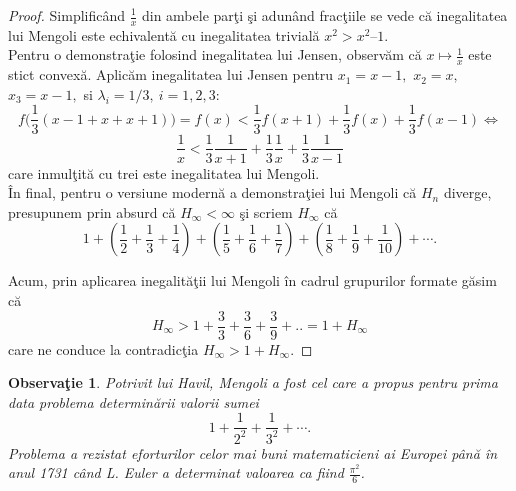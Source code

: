 \documentclass[a4paper,12pt,oneside]{report}
\newtheorem{remark}{Observa\c{t}ie}
\begin{document}
\begin{proof}
Simplific\^{a}nd \(\frac{1}{x}\) din ambele par\c{t}i \c{s}i adun\^{a}nd frac\c{t}iile se vede c\u{a} inegalitatea lui Mengoli este echivalent\u{a} cu inegalitatea  trivial\u{a} \(x^{2} >  x^{2} – 1\). \\
Pentru o demonstra\c{t}ie folosind inegalitatea lui Jensen, observ\u{a}m c\u{a} \(x \mapsto \frac{1}{x}\) este stict convex\u{a}. Aplic\u{a}m inegalitatea lui Jensen pentru $x_1=x-1,$ $x_2=x,$ $x_3=x-1,$ si $\lambda_i=1/3,~i=1, 2, 3:$
\[
f\biggl(\frac{1}{3}(x-1+x+x+1)\biggr)=f(x)<\frac{1}{3}f(x+1)+\frac{1}{3}f(x)+\frac{1}{3}f(x-1)\Leftrightarrow
\]
\[
\frac{1}{x}<\frac{1}{3}\frac{1}{x+1}+\frac{1}{3}\frac{1}{x}+\frac{1}{3}\frac{1}{x-1}
\]
care inmul\c{t}it\u{a} cu trei este inegalitatea lui Mengoli.\\
\^{I}n final, pentru o versiune modern\u{a} a demonstra\c{t}iei lui Mengoli c\u{a} \(H_{n}\) diverge, presupunem prin absurd c\u{a} \(H_{\infty }< \infty\) \c{s}i scriem \(H_{\infty }\) c\u{a}
\begin{displaymath}
  1 + \left ( \frac{1}{2} + \frac{1}{3} + \frac{1}{4} \right ) + \left ( \frac{1}{5} + \frac{1}{6} + \frac{1}{7} \right ) + \left ( \frac{1}{8} + \frac{1}{9} +\frac{1}{10} \right )+\cdots.
\end{displaymath}

Acum, prin aplicarea inegalit\u{a}\c{t}ii lui Mengoli \^{i}n cadrul grupurilor formate g\u{a}sim c\u{a}
\[
H_{\infty }>1 + \frac{3}{3} + \frac{3}{6} + \frac{3}{9} + ..= 1 + H_{\infty }
\]
care ne conduce la contradic\c{t}ia \(H_{\infty } > 1 + H_{\infty }\).
\end{proof}
\begin{remark}
Potrivit lui Havil, Mengoli a fost cel care a propus pentru prima data problema determin\u{a}rii valorii sumei \[1 + \frac{1}{2^{2}} + \frac{1}{3^{2}} + \cdots.\]
Problema a rezistat eforturilor celor mai buni matematicieni ai Europei p\^{a}n\u{a} \^{i}n anul 1731 c\^{a}nd L. Euler a determinat valoarea ca fiind \(\frac{\pi^{2}}{6}\).
\end{remark}
\end{document}
